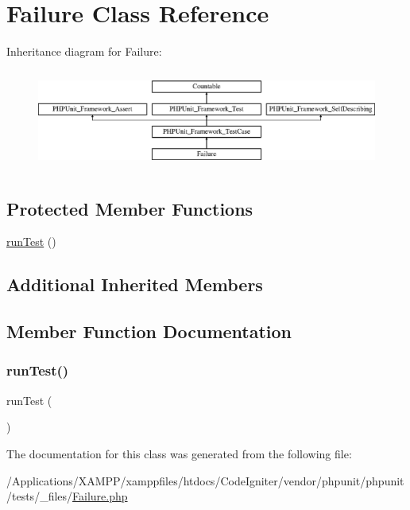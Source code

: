 \hypertarget{class_failure}{}\section{Failure Class Reference}
\label{class_failure}
Inheritance diagram for Failure\+:\begin{figure}[H]
\begin{center}
\leavevmode
\includegraphics[height=3.303835cm]{class_failure}
\end{center}
\end{figure}
\subsection*{Protected Member Functions}
\begin{DoxyCompactItemize}
\item 
\mbox{\hyperlink{class_failure_ad2541a093be4d619db04ed65d661a684}{run\+Test}} ()
\end{DoxyCompactItemize}
\subsection*{Additional Inherited Members}


\subsection{Member Function Documentation}
\mbox{\label{class_failure_ad2541a093be4d619db04ed65d661a684}} 
\subsubsection{\texorpdfstring{run\+Test()}{runTest()}}
{\footnotesize\ttfamily run\+Test (\begin{DoxyParamCaption}{ }\end{DoxyParamCaption})\hspace{0.3cm}{\ttfamily [protected]}}



The documentation for this class was generated from the following file\+:\begin{DoxyCompactItemize}
\item 
/\+Applications/\+X\+A\+M\+P\+P/xamppfiles/htdocs/\+Code\+Igniter/vendor/phpunit/phpunit/tests/\+\_\+files/\mbox{\hyperlink{_failure_8php}{Failure.\+php}}\end{DoxyCompactItemize}
